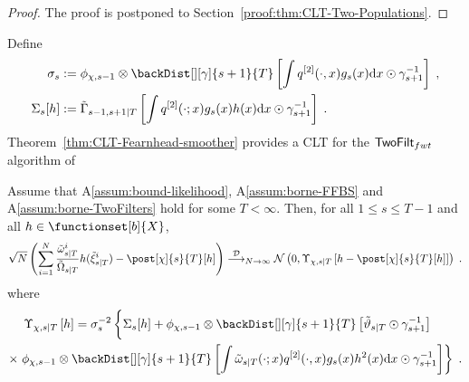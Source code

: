 \begin{proof}
The proof is postponed to Section~\ref{proof:thm:CLT-Two-Populations}.
\end{proof}
Define
\begin{align*}
\sigma_s &\eqdef \filt{\Xinit,s-1} \otimes \backDist[][\gamma]{s+1}{T} \left[ \int  q^{[2]}(\cdot,x) g_s(x) \rmd x \odot \fakeprior_{s+1}^{-1} \right] \eqsp, \\
\Sigma_s[h] &\eqdef \asymVarJoint{s-1,s+1}{T}{\int q^{[2]}(\cdot;x) g_s(x)  h(x) \rmd x \odot \fakeprior_{s+1}^{-1}} \eqsp.
\end{align*}
Theorem~\ref{thm:CLT-Fearnhead-smoother} provides a CLT for the $\mathsf{TwoFilt}_{fwt}$ algorithm of \cite{fearnhead:wyncoll:tawn:2010}
\begin{thm}
\label{thm:CLT-Fearnhead-smoother}
Assume that A\ref{assum:bound-likelihood}, A\ref{assum:borne-FFBS} and A\ref{assum:borne-TwoFilters} hold for some $T<\infty$. Then,  for all $1\le s \le T-1$ and all $h \in \functionset[b]{X}$,
\begin{equation*}
\sqrt{N}\left( \sum_{i=1}^N \frac{\smwght{s}{T}{i}}{\tilde{\Omega}_{s|T}} h(\smpart{s}{T}{i}) - \post[\Xinit]{s}{T}[h]
\right)
\dlim_{N \to \infty} \mathcal{N}\left(0,\asymVarFearnhead[\Xinit]{s}{T}{h - \post[\Xinit]{s}{T}[h]}\right) \eqsp.
\end{equation*}
where
\begin{multline}
\label{eqdef:asymvarfearnhead} 
\asymVarFearnhead[\Xinit]{s}{T}{h}= \sigma_s^{-2} \left\{ \Sigma_s[h] + \filt{\Xinit,s-1} \otimes \backDist[][\gamma]{s+1}{T} \left[\adjfunc[smooth]{s}{T}{} \odot \fakeprior^{-1}_{s+1} \right] \phantom{\int} \right. \\  \times \left.  \filt{\Xinit,s-1} \otimes \backDist[][\gamma]{s+1}{T}\left[ \int \smwghtfunc{s}{T}(\cdot;x) q^{[2]}(\cdot,x) g_s(x) h^2(x) \rmd x \odot \fakeprior^{-1}_{s+1} \right]\right\} \eqsp.
\end{multline}
\end{thm}

